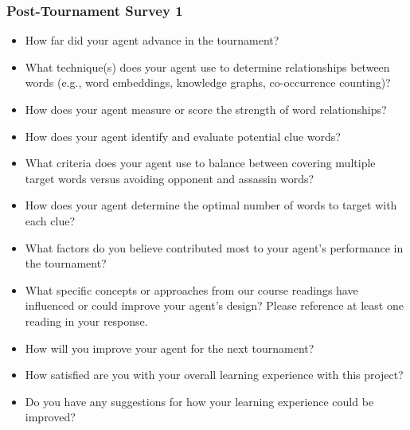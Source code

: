 \documentclass[phd,electronic,oneside,twosidetoc,letterpaper,chaptercenter,parttop,lof]{byumsphd}
\begin{document}
\subsubsection{Post-Tournament Survey 1}
\begin{itemize}
    \item How far did your agent advance in the tournament?
    \item What technique(s) does your agent use to determine relationships between words (e.g., word embeddings, knowledge graphs, co-occurrence counting)?
    \item How does your agent measure or score the strength of word relationships?
    \item How does your agent identify and evaluate potential clue words?
    \item What criteria does your agent use to balance between covering multiple target words versus avoiding opponent and assassin words?
    \item How does your agent determine the optimal number of words to target with each clue?
    \item What factors do you believe contributed most to your agent's performance in the tournament?
    \item What specific concepts or approaches from our course readings have influenced or could improve your agent's design? Please reference at least one reading in your response.
    \item How will you improve your agent for the next tournament?
    \item How satisfied are you with your overall learning experience with this project?\textdagger
    \item Do you have any suggestions for how your learning experience could be improved?
\end{itemize}
\end{document}
